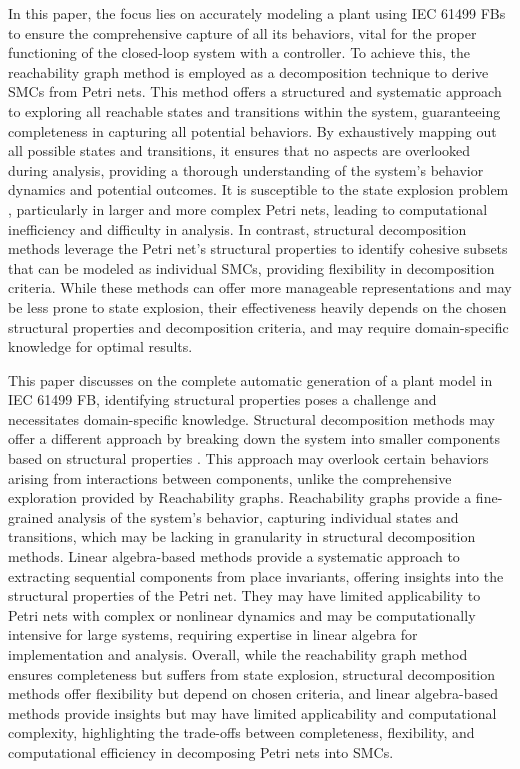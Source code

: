 \documentclass{ieeeojies}
\begin{document}
In this paper, the focus lies on accurately modeling a plant using IEC 61499 FBs to ensure the comprehensive capture of all its behaviors, vital for the proper functioning of the closed-loop system with a controller. To achieve this, the reachability graph \cite{miyamoto2013modular, giua1994petri} method is employed as a decomposition technique to derive SMCs from Petri nets. This method offers a structured and systematic approach to exploring all reachable states and transitions within the system, guaranteeing completeness in capturing all potential behaviors. By exhaustively mapping out all possible states and transitions, it ensures that no aspects are overlooked during analysis, providing a thorough understanding of the system's behavior dynamics and potential outcomes. It is susceptible to the state explosion problem \cite{kungas2005petri,buchholz2002hierarchical}, particularly in larger and more complex Petri nets, leading to computational inefficiency and difficulty in analysis. In contrast, structural decomposition methods leverage the Petri net's structural properties \cite{wisniewski2019analysis} to identify cohesive subsets that can be modeled as individual SMCs, providing flexibility in decomposition criteria. While these methods can offer more manageable representations and may be less prone to state explosion, their effectiveness heavily depends on the chosen structural properties and decomposition criteria, and may require domain-specific knowledge for optimal results. 

This paper discusses on the complete automatic generation of a plant model in IEC 61499 FB, identifying structural properties poses a challenge and necessitates domain-specific knowledge. Structural decomposition methods may offer a different approach by breaking down the system into smaller components based on structural properties \cite{kiviriga2023efficient}. This approach may overlook certain behaviors arising from interactions between components, unlike the comprehensive exploration provided by Reachability graphs. Reachability graphs provide a fine-grained analysis of the system's behavior, capturing individual states and transitions, which may be lacking in granularity in structural decomposition methods. Linear algebra-based methods \cite{wisniewski2014theoretical} provide a systematic approach to extracting sequential components from place invariants, offering insights into the structural properties of the Petri net. They may have limited applicability to Petri nets with complex or nonlinear dynamics and may be computationally intensive for large systems, requiring expertise in linear algebra \cite{cai1995modeling, wisniewski2019decomposition} for implementation and analysis. Overall, while the reachability graph method ensures completeness but suffers from state explosion, structural decomposition methods offer flexibility but depend on chosen criteria, and linear algebra-based methods provide insights but may have limited applicability and computational complexity, highlighting the trade-offs between completeness, flexibility, and computational efficiency in decomposing Petri nets into SMCs. 
\end{document}
